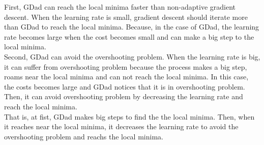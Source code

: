 \documentclass[a4paper]{article}
\begin{document}
First, GDad can reach the local minima faster than non-adaptive gradient descent. When the learning rate is small, gradient descent should iterate more than GDad to reach the local minima. Because, in the case of GDad, the learning rate becomes large when the cost becomes small and can make a big step to the local minima.\\
Second, GDad can avoid the overshooting problem. When the learning rate is big, it can suffer from overshooting problem because the process makes a big step, roams near the local minima and can not reach the local minima. In this case, the costs becomes large and GDad notices that it is in overshooting problem. Then, it can avoid overshooting problem by decreasing the learning rate and reach the local minima. \\
That is, at fist, GDad makes big steps to find the the local minima. Then, when it reaches near the local minima, it decreases the learning rate to avoid the overshooting problem and reachs the local minima.
   
\end{document}
